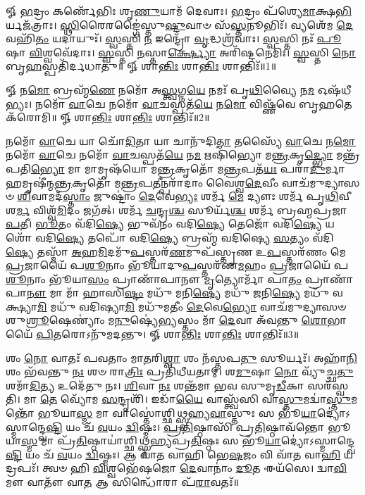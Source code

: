 


𑍐 \ul{𑌭}\-𑌦𑍍𑌰𑌂 𑌕𑌰𑍍𑌣𑍇᳴𑌭𑌿𑌃 𑌶𑍃\-\ul{𑌣𑍁}\-𑌯𑌾𑌮᳴ 𑌦𑍇𑌵𑌾𑌃। \ul{𑌭}\-𑌦𑍍𑌰𑌂 𑌪᳴𑌶𑍍𑌯𑍇\-\ul{𑌮𑌾}\-𑌕𑍍𑌷\-\ul{𑌭𑌿}\-𑌰𑍍𑌯𑌜᳴𑌤𑍍𑌰𑌾𑌃। 
\-\ul{𑌸𑍍𑌥𑌿}\-𑌰𑍈𑌰𑌙𑍍𑌗𑍈॑𑌸𑍍𑌤𑍁\-\ul{𑌷𑍍𑌟𑍁}\-𑌵𑌾𑍞 𑌸᳴\-\ul{𑌸𑍍𑌤}\-𑌨𑍂𑌭𑌿𑌃᳴। 𑌵𑍍𑌯𑌶𑍇᳴𑌮 \ul{𑌦𑍇}\-𑌵𑌹𑌿᳴\-\ul{𑌤𑌂} 𑌯𑌦𑌾𑌯𑍁𑌃᳴। 
\-\ul{𑌸𑍍𑌵}\-𑌸𑍍𑌤𑌿 \ul{𑌨} 𑌇𑌨𑍍𑌦𑍍𑌰𑍋᳴ \ul{𑌵𑍃}\-𑌦𑍍𑌧𑌶𑍍𑌰᳴𑌵𑌾𑌃। \ul{𑌸𑍍𑌵}\-𑌸𑍍𑌤𑌿 𑌨𑌃᳴ \ul{𑌪𑍂}\-𑌷𑌾 \ul{𑌵𑌿}\-𑌶𑍍𑌵𑌵𑍇᳴𑌦𑌾𑌃। 
\-\ul{𑌸𑍍𑌵}\-𑌸𑍍𑌤𑌿 \ul{𑌨}\-𑌸𑍍𑌤𑌾\-\ul{𑌰𑍍𑌕𑍍𑌷𑍍𑌯𑍋} 𑌅𑌰𑌿᳴𑌷𑍍𑌟𑌨𑍇𑌮𑌿𑌃। \ul{𑌸𑍍𑌵}\-𑌸𑍍𑌤𑌿 \ul{𑌨𑍋} 𑌬𑍃\-\ul{𑌹}\-𑌸𑍍𑌪𑌤𑌿᳴𑌰𑍍𑌦𑌧𑌾𑌤𑍁॥
𑍐 𑌶𑌾\-\ul{𑌨𑍍𑌤𑌿𑌃} 𑌶𑌾\-\ul{𑌨𑍍𑌤𑌿𑌃} 𑌶𑌾𑌨𑍍𑌤𑌿𑌃᳴॥1॥


𑍐 𑌨\-\ul{𑌮𑍋} 𑌬𑍍𑌰𑌹𑍍𑌮᳴\-\ul{𑌣𑍇} 𑌨𑌮𑍋᳴ 𑌅\-\ul{𑌸𑍍𑌤𑍍𑌵}\-𑌗𑍍𑌨\-\ul{𑌯𑍇} 𑌨𑌮𑌃᳴ 𑌪𑍃\-\ul{𑌥𑌿}\-𑌵𑍍𑌯𑍈 𑌨\-\ul{𑌮} 𑌓𑌷᳴𑌧𑍀𑌭𑍍𑌯𑌃। 𑌨𑌮𑍋᳴ \ul{𑌵𑌾}\-𑌚𑍇 𑌨𑌮𑍋᳴ \ul{𑌵𑌾}\-𑌚𑌸𑍍𑌪𑌤᳴\-\ul{𑌯𑍇} 𑌨\-\ul{𑌮𑍋} 𑌵𑌿𑌷𑍍𑌣᳴𑌵𑍇 𑌬𑍃\-\ul{𑌹}\-𑌤𑍇 𑌕᳴𑌰𑍋𑌮𑌿॥
𑍐 𑌶𑌾\-\ul{𑌨𑍍𑌤𑌿𑌃} 𑌶𑌾\-\ul{𑌨𑍍𑌤𑌿𑌃} 𑌶𑌾𑌨𑍍𑌤𑌿𑌃᳴॥2॥


𑌨𑌮𑍋᳴ \ul{𑌵𑌾}\-𑌚𑍇 𑌯𑌾 𑌚𑍋᳴\-\ul{𑌦𑌿}\-𑌤𑌾 𑌯𑌾 𑌚𑌾𑌨𑍁᳴𑌦𑌿\-\ul{𑌤𑌾} 𑌤𑌸𑍍𑌯𑍈᳴ \ul{𑌵𑌾}\-𑌚𑍇 𑌨\-\ul{𑌮𑍋} 𑌨𑌮𑍋᳴ \ul{𑌵𑌾}\-𑌚𑍇 𑌨𑌮𑍋᳴ \ul{𑌵𑌾}\-𑌚𑌸𑍍𑌪𑌤᳴\-\ul{𑌯𑍇} 𑌨\-\ul{𑌮} 𑌋𑌷𑌿᳴𑌭𑍍𑌯𑍋 𑌮\-\ul{𑌨𑍍𑌤𑍍𑌰}\-𑌕𑍃\-\ul{𑌦𑍍𑌭𑍍𑌯𑍋} 𑌮𑌨𑍍𑌤𑍍𑌰᳴𑌪𑌤𑌿\-\ul{𑌭𑍍𑌯𑍋} 𑌮𑌾 𑌮𑌾𑌮𑍃𑌷᳴𑌯𑍋 𑌮\-\ul{𑌨𑍍𑌤𑍍𑌰}\-𑌕𑍃𑌤𑍋᳴ 𑌮\-\ul{𑌨𑍍𑌤𑍍𑌰}\-𑌪𑌤᳴\-\ul{𑌯𑌃} 𑌪𑌰𑌾᳴\-\ul{𑌦𑍁}\-𑌰𑍍𑌮𑌾𑌹𑌮𑍃𑌷𑍀॑𑌨𑍍𑌮\-\ul{𑌨𑍍𑌤𑍍𑌰}\-𑌕𑍃𑌤𑍋᳴ 𑌮\-\ul{𑌨𑍍𑌤𑍍𑌰}\-𑌪\-\ul{𑌤𑍀}\-𑌨𑍍𑌪𑌰𑌾᳴𑌦𑌾𑌂 𑌵𑍈𑌶𑍍𑌵\-\ul{𑌦𑍇}\-𑌵𑍀𑌂 𑌵𑌾𑌚᳴𑌮𑍁𑌦𑍍𑌯𑌾𑌸𑍞 \ul{𑌶𑌿}\-𑌵𑌾𑌮𑌦᳴\-\ul{𑌸𑍍𑌤𑌾𑌂} 𑌜𑍁𑌷𑍍𑌟𑌾𑌂॑ \ul{𑌦𑍇}\-𑌵𑍇\-\ul{𑌭𑍍𑌯𑌃} 𑌶𑌰𑍍𑌮᳴ \ul{𑌮𑍇} 𑌦𑍍𑌯𑍗𑌃  𑌶𑌰𑍍𑌮᳴ 𑌪𑍃\-\ul{𑌥𑌿}\-𑌵𑍀 𑌶\-\ul{𑌰𑍍𑌮} 𑌵𑌿𑌶𑍍𑌵᳴\-\ul{𑌮𑌿}\-𑌦𑌂 𑌜𑌗᳴𑌤𑍍। 𑌶𑌰𑍍𑌮᳴ \ul{𑌚}\-𑌨𑍍𑌦𑍍𑌰\-\ul{𑌶𑍍𑌚} 𑌸𑍂𑌰𑍍𑌯᳴\-\ul{𑌶𑍍𑌚} 𑌶𑌰𑍍𑌮᳴ 𑌬𑍍𑌰𑌹𑍍𑌮𑌪𑍍𑌰𑌜𑌾\-\ul{𑌪}\-𑌤𑍀। \ul{𑌭𑍂}\-𑌤𑌂 𑌵᳴𑌦𑌿\-\ul{𑌷𑍍𑌯𑍇} 𑌭𑍁𑌵᳴𑌨𑌂 𑌵𑌦𑌿\-\ul{𑌷𑍍𑌯𑍇} 𑌤𑍇𑌜𑍋᳴ 𑌵𑌦𑌿\-\ul{𑌷𑍍𑌯𑍇} 𑌯𑌶𑍋᳴ 𑌵𑌦𑌿\-\ul{𑌷𑍍𑌯𑍇} 𑌤𑌪𑍋᳴ 𑌵𑌦𑌿\-\ul{𑌷𑍍𑌯𑍇} 𑌬𑍍𑌰𑌹𑍍𑌮᳴ 𑌵𑌦𑌿𑌷𑍍𑌯𑍇 \ul{𑌸}\-𑌤𑍍𑌯𑌂 𑌵᳴𑌦𑌿\-\ul{𑌷𑍍𑌯𑍇} 𑌤𑌸𑍍𑌮𑌾᳴ \ul{𑌅}\-𑌹\-\ul{𑌮𑌿}\-𑌦𑌮𑍁᳴\-\ul{𑌪}\-𑌸𑍍𑌤𑌰᳴\-\ul{𑌣}\-𑌮𑍁𑌪᳴𑌸𑍍𑌤𑍃𑌣 𑌉\-\ul{𑌪}\-𑌸𑍍𑌤𑌰᳴𑌣𑌂 𑌮𑍇 \ul{𑌪𑍍𑌰}\-𑌜𑌾𑌯𑍈᳴ 𑌪\-\ul{𑌶𑍂}\-𑌨𑌾𑌂 𑌭𑍂᳴𑌯𑌾𑌦𑍁\-\ul{𑌪}\-𑌸𑍍𑌤𑌰᳴𑌣\-\ul{𑌮}\-𑌹𑌂 \ul{𑌪𑍍𑌰}\-𑌜𑌾𑌯𑍈᳴ 𑌪\-\ul{𑌶𑍂}\-𑌨𑌾𑌂 𑌭𑍂᳴𑌯𑌾\-\ul{𑌸𑌂} 𑌪𑍍𑌰𑌾𑌣𑌾᳴𑌪𑌾𑌨𑍗 \ul{𑌮𑍃}\-𑌤𑍍𑌯𑍋𑌰𑍍𑌮𑌾᳴ 𑌪𑌾\-\ul{𑌤𑌂} 𑌪𑍍𑌰𑌾𑌣𑌾᳴𑌪𑌾\-\ul{𑌨𑍗} 𑌮𑌾 𑌮𑌾᳴ 𑌹𑌾𑌸𑌿\-\ul{𑌷𑍍𑌟𑌂} 𑌮𑌧𑍁᳴ 𑌮𑌨𑌿\-\ul{𑌷𑍍𑌯𑍇} 𑌮𑌧𑍁᳴ 𑌜𑌨𑌿\-\ul{𑌷𑍍𑌯𑍇} 𑌮𑌧𑍁᳴ 𑌵𑌕𑍍𑌷𑍍𑌯𑌾\-\ul{𑌮𑌿} 𑌮𑌧𑍁᳴ 𑌵𑌦𑌿𑌷𑍍𑌯𑌾\-\ul{𑌮𑌿} 𑌮𑌧𑍁᳴𑌮𑌤𑍀𑌂 \ul{𑌦𑍇}\-𑌵𑍇\-\ul{𑌭𑍍𑌯𑍋} 𑌵𑌾𑌚᳴𑌮𑍁𑌦𑍍𑌯𑌾𑌸𑍞 𑌶𑍁\-\ul{𑌶𑍍𑌰𑍂}\-𑌷𑍇𑌣𑍍𑌯𑌾𑌂॑ 𑌮\-\ul{𑌨𑍁}\-𑌷𑍍𑌯𑍇॑\-\ul{𑌭𑍍𑌯}\-𑌸𑍍𑌤𑌂 𑌮𑌾᳴ \ul{𑌦𑍇}\-𑌵𑌾 𑌅᳴𑌵𑌨𑍍𑌤𑍁 \ul{𑌶𑍋}\-𑌭𑌾𑌯𑍈᳴ \ul{𑌪𑌿}\-𑌤𑌰𑍋𑌽𑌨𑍁᳴𑌮𑌦𑌨𑍍𑌤𑍁। 𑍐 𑌶𑌾\-\ul{𑌨𑍍𑌤𑌿𑌃} 𑌶𑌾\-\ul{𑌨𑍍𑌤𑌿𑌃} 𑌶𑌾𑌨𑍍𑌤𑌿𑌃᳴॥3॥

𑌶𑌂 \ul{𑌨𑍋} 𑌵𑌾𑌤𑌃᳴ 𑌪𑌵𑌤𑌾𑌂 𑌮𑌾\-\ul{𑌤}\-𑌰𑌿\-\ul{𑌶𑍍𑌵𑌾} 𑌶𑌂 𑌨᳴𑌸𑍍𑌤𑌪\-\ul{𑌤𑍁} 𑌸𑍂𑌰𑍍𑌯𑌃᳴। 𑌅𑌹𑌾᳴\-\ul{𑌨𑌿}\-𑌶𑌂 𑌭᳴𑌵𑌨𑍍𑌤𑍁 \ul{𑌨𑌃} 𑌶𑍞 𑌰𑌾\-\ul{𑌤𑍍𑌰𑌿𑌃} 𑌪𑍍𑌰𑌤𑌿᳴𑌧𑍀𑌯𑌤𑌾𑌮𑍍। 𑌶\-\ul{𑌮𑍁}\-𑌷𑌾 \ul{𑌨𑍋} 𑌵𑍍𑌯𑍁᳴𑌚𑍍𑌛\-\ul{𑌤𑍁} 𑌶𑌮𑌾᳴\-\ul{𑌦𑌿}\-𑌤𑍍𑌯 𑌉𑌦𑍇᳴𑌤𑍁 𑌨𑌃। \ul{𑌶𑌿}\-𑌵𑌾 \ul{𑌨𑌃} 𑌶𑌨𑍍𑌤᳴𑌮𑌾 𑌭𑌵 𑌸𑍁𑌮𑍃\-\ul{𑌡𑍀}\-𑌕𑌾 𑌸𑌰᳴𑌸𑍍𑌵𑌤𑌿। 𑌮𑌾 \ul{𑌤𑍇} 𑌵𑍍𑌯𑍋᳴𑌮 \ul{𑌸}\-𑌨𑍍𑌦𑍃𑌶𑌿᳴। 𑌇𑌡𑌾᳴\-\ul{𑌯𑍈} 𑌵𑌾𑌸𑍍𑌤𑍍𑌵᳴𑌸𑌿 𑌵𑌾\-\ul{𑌸𑍍𑌤𑍁}\-𑌮𑌦𑍍𑌵𑌾॑\-\ul{𑌸𑍍𑌤𑍁}\-𑌮𑌨𑍍𑌤𑍋᳴ 𑌭𑍂𑌯𑌾\-\ul{𑌸𑍍𑌮} 𑌮𑌾 𑌵𑌾𑌸𑍍𑌤𑍋॑𑌶𑍍𑌛𑌿𑌥𑍍𑌸𑍍𑌮𑌹𑍍𑌯\-\ul{𑌵𑌾}\-𑌸𑍍𑌤𑍁𑌃 𑌸 𑌭𑍂᳴\-\ul{𑌯𑌾}\-𑌦𑍍𑌯𑍋॑𑌽𑌸𑍍𑌮𑌾𑌨𑍍𑌦𑍍𑌵𑍇\-\ul{𑌷𑍍𑌟𑌿} 𑌯𑌂 𑌚᳴ \ul{𑌵}\-𑌯𑌂 \ul{𑌦𑍍𑌵𑌿}\-𑌷𑍍𑌮𑌃। \ul{𑌪𑍍𑌰}\-\-\ul{𑌤𑌿}\-𑌷𑍍𑌠𑌾𑌸𑌿᳴ 𑌪𑍍𑌰\-\ul{𑌤𑌿}\-𑌷𑍍𑌠𑌾𑌵᳴𑌨𑍍𑌤𑍋 𑌭𑍂𑌯𑌾\-\ul{𑌸𑍍𑌮} 𑌮𑌾 𑌪𑍍𑌰᳴\-\ul{𑌤𑌿}\-𑌷𑍍𑌠𑌾𑌯𑌾॑𑌶𑍍𑌛𑌿𑌥𑍍𑌸𑍍𑌮𑌹𑍍𑌯𑌪𑍍𑌰\-\ul{𑌤𑌿}\-𑌷𑍍𑌠𑌃 𑌸 𑌭𑍂᳴\-\ul{𑌯𑌾}\-𑌦𑍍𑌯𑍋॑𑌽𑌸𑍍𑌮𑌾𑌨𑍍𑌦𑍍𑌵𑍇\-\ul{𑌷𑍍𑌟𑌿} 𑌯𑌂 𑌚᳴ \ul{𑌵}\-𑌯𑌂 \ul{𑌦𑍍𑌵𑌿}\-𑌷𑍍𑌮𑌃। 𑌆 𑌵𑌾᳴𑌤 𑌵𑌾𑌹𑌿 𑌭𑍇\-\ul{𑌷}\-𑌜𑌂 𑌵𑌿 𑌵𑌾᳴𑌤 𑌵𑌾\-\ul{𑌹𑌿} 𑌯𑌦𑍍𑌰𑌪𑌃᳴। 𑌤𑍍𑌵𑍞 𑌹𑌿 \ul{𑌵𑌿}\-𑌶𑍍𑌵𑌭𑍇᳴𑌷𑌜𑍋 \ul{𑌦𑍇}\-𑌵𑌾𑌨𑌾𑌂॑ \ul{𑌦𑍂}\-𑌤 𑌈𑌯᳴𑌸𑍇। 𑌦𑍍𑌵𑌾\-\ul{𑌵𑌿}\-𑌮𑍗 𑌵𑌾𑌤𑍗᳴ 𑌵𑌾\-\ul{𑌤} 𑌆 𑌸𑌿𑌨𑍍𑌧𑍋᳴𑌰𑌾 𑌪᳴\-\ul{𑌰𑌾}\-𑌵𑌤𑌃᳴॥

